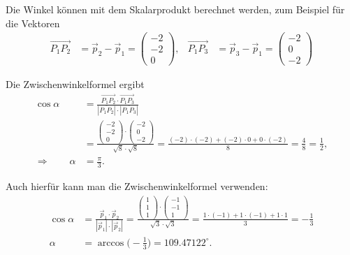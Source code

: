 \begin{loesung}
Die Winkel können mit dem Skalarprodukt berechnet werden, zum
Beispiel für die Vektoren
\begin{align*}
\overrightarrow{P_1P_2}&=\vec p_2-\vec p_1=\begin{pmatrix}-2\\-2\\ 0\end{pmatrix},&
\overrightarrow{P_1P_3}&=\vec p_3-\vec p_1=\begin{pmatrix}-2\\ 0\\-2\end{pmatrix}
\end{align*}
\begin{teilaufgaben}
\item
Die Zwischenwinkelformel ergibt
\begin{align*}
\cos\alpha
&=
\frac{\overrightarrow{P_1P_2}\cdot\overrightarrow{P_1P_3}}{
|\overline{P_1P_2}|\cdot |\overline{P_1P_3}|
}
\\
&=
\frac{
\begin{pmatrix}-2\\-2\\ 0\end{pmatrix}\cdot
\begin{pmatrix}-2\\ 0\\-2\end{pmatrix}
}{
\sqrt{8}\cdot\sqrt{8}
}
=\frac{(-2)\cdot(-2)+(-2)\cdot 0+0\cdot(-2)}{8}
=\frac{4}{8}=\frac12,\\
\Rightarrow\qquad\alpha&=\frac{\pi}3.
\end{align*}
\item
Auch hierfür kann man die Zwischenwinkelformel verwenden:
\begin{align*}
\cos\alpha&=
\frac{\vec p_1\cdot\vec p_2}{|\vec p_1|\cdot |\vec p_2|}
=
\frac{\begin{pmatrix}1\\1\\1\end{pmatrix}\cdot\begin{pmatrix}-1\\-1\\1\end{pmatrix}}{\sqrt{3}\cdot\sqrt{3}}
=
\frac{1\cdot(-1)+1\cdot(-1)+1\cdot 1}{3}=-\frac13
\\
\alpha&=\arccos\biggl(-\frac13\biggr)= 109.47122^\circ.
\end{align*}

\end{teilaufgaben}
\end{loesung}
